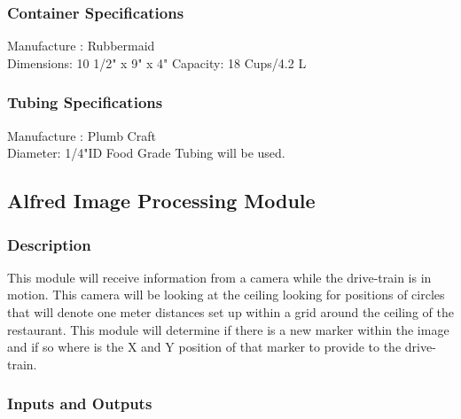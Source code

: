 \documentclass [10pt]{article}
\begin{document}

\subsubsection{Container Specifications} 

Manufacture : Rubbermaid \\
Dimensions: 10 1/2" x 9" x 4" 
Capacity: 18 Cups/4.2 L\\


\subsubsection{Tubing Specifications}
Manufacture : Plumb Craft \\
Diameter: 1/4"ID Food Grade Tubing will be used.\\



\subsection{Alfred Image Processing Module }


\subsubsection{Description}
This module will receive information from a camera while the drive-train is in motion. This camera will be looking at the ceiling looking for positions of circles that will denote one meter distances set up within a grid around the ceiling of the restaurant. This module will determine if there is a new marker within the image and if so where is the X and Y position of that marker to provide to the drive-train.


\subsubsection{Inputs and Outputs}
\end{document}
